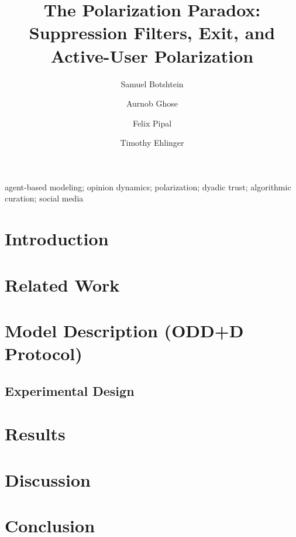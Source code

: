 \documentclass{JASSS}
\title{The Polarization Paradox: Suppression Filters, Exit, and Active-User Polarization}
\author[1]{Samuel Botshtein}
\author[1]{Aurnob Ghose}
\author[1]{Felix Pipal}
\author[2]{Timothy Ehlinger}
\affil[1]{Independent Researcher}
\affil[2]{University of Wisconsin--Milwaukee}
\begin{document}
\maketitle

\begin{abstract}{%
%
}
\end{abstract}

\begin{keywords}{agent-based modeling; opinion dynamics; polarization; dyadic trust; algorithmic curation; social media}
\end{keywords}

\parano{}

\section{Introduction}
\label{sec:intro}


\section{Related Work}
\label{sec:related}


\section{Model Description (ODD+D Protocol)}
\label{sec:model}


\subsection{Experimental Design}
\label{sec:experiment}


\section{Results}
\label{sec:results}


\section{Discussion}
\label{sec:discussion}


\section{Conclusion}
\label{sec:conclusion}

\end{document}
